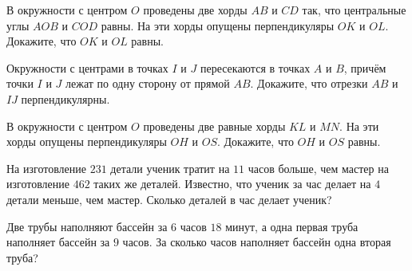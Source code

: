 \begin{class}[number=5]
\begin{listofex}
		\item В окружности с центром \( O \) проведены две хорды \( AB \) и \( CD \) так, что центральные углы \( AOB \) и \( COD \) равны. На эти хорды опущены перпендикуляры \( OK \) и \( OL \). Докажите, что \( OK \) и \( OL \) равны.
		\item Окружности с центрами в точках \( I \) и \( J \) пересекаются в точках \( A \) и \( B \), причём точки \( I \) и \( J \) лежат по одну сторону от прямой \( AB \). Докажите, что отрезки \( AB \) и \( IJ \) перпендикулярны.
		\item В окружности с центром \( O \) проведены две равные хорды \( KL \) и \( MN \). На эти хорды опущены перпендикуляры \( OH \) и \( OS \). Докажите, что \( OH \) и \( OS \) равны.
		\item На изготовление \( 231 \) детали ученик тратит на \( 11 \) часов больше, чем мастер на изготовление \( 462 \) таких же деталей. Известно, что ученик за час делает на \( 4 \) детали меньше, чем мастер. Сколько деталей в час делает ученик?
		\item Две трубы наполняют бассейн за \( 6 \) часов \( 18 \) минут, а одна первая труба наполняет бассейн за \( 9 \) часов. За сколько часов наполняет бассейн одна вторая труба?
	\end{listofex}
\end{class}

